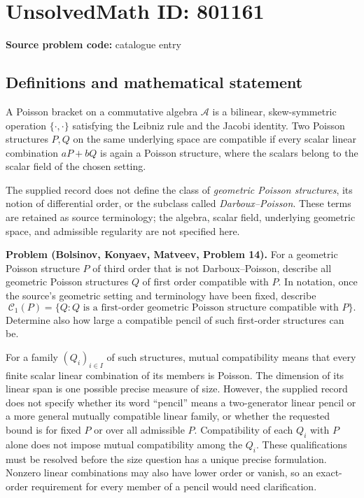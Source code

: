 \documentclass[11pt]{article}
\begin{document}
\section*{UnsolvedMath ID: 801161}
\textbf{Source problem code:} catalogue entry
\subsection{Definitions and mathematical statement}
A Poisson bracket on a commutative algebra \(\mathcal A\) is a bilinear, skew-symmetric operation \(\{\cdot,\cdot\}\) satisfying the Leibniz rule and the Jacobi identity. Two Poisson structures \(P,Q\) on the same underlying space are compatible if every scalar linear combination \(aP+bQ\) is again a Poisson structure, where the scalars belong to the scalar field of the chosen setting.

The supplied record does not define the class of \emph{geometric Poisson structures}, its notion of differential order, or the subclass called \emph{Darboux--Poisson}. These terms are retained as source terminology; the algebra, scalar field, underlying geometric space, and admissible regularity are not specified here.

\textbf{Problem (Bolsinov, Konyaev, Matveev, Problem 14).} For a geometric Poisson structure \(P\) of third order that is not Darboux--Poisson, describe all geometric Poisson structures \(Q\) of first order compatible with \(P\). In notation, once the source's geometric setting and terminology have been fixed, describe
\[
\mathcal C_1(P)=\bigl\{Q: Q\text{ is a first-order geometric Poisson structure compatible with }P\bigr\}.
\]
Determine also how large a compatible pencil of such first-order structures can be.

For a family \((Q_i)_{i\in I}\) of such structures, mutual compatibility means that every finite scalar linear combination of its members is Poisson. The dimension of its linear span is one possible precise measure of size. However, the supplied record does not specify whether its word ``pencil'' means a two-generator linear pencil or a more general mutually compatible linear family, or whether the requested bound is for fixed \(P\) or over all admissible \(P\). Compatibility of each \(Q_i\) with \(P\) alone does not impose mutual compatibility among the \(Q_i\). These qualifications must be resolved before the size question has a unique precise formulation. Nonzero linear combinations may also have lower order or vanish, so an exact-order requirement for every member of a pencil would need clarification.
\end{document}
